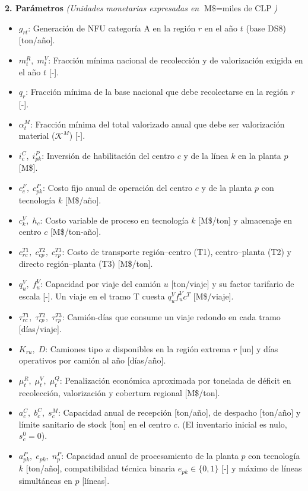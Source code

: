 \documentclass[letterpaper]{article}
\begin{document}
\textbf{2. Parámetros} \textit{(Unidades monetarias expresadas en $\text{M\$} = \text{miles de CLP}$)}
\begin{itemize}\setlength{\itemsep}{1pt}\setlength{\parskip}{0pt}
    \item $g_{rt}$: Generación de NFU categoría A en la región $r$ en el año $t$ (base DS8) [ton/año].
    \item $m^{R}_{t},\; m^{V}_{t}$: Fracción mínima nacional de recolección y de valorización exigida en el año $t$ [-].
    \item $q_{r}$: Fracción mínima de la base nacional que debe recolectarse en la región $r$ [-].
    \item $\alpha^{M}_{t}$: Fracción mínima del total valorizado anual que debe ser valorización material ($\mathcal{K}^{M}$) [-].
    \item $i^{C}_{c},\; i^{P}_{pk}$: Inversión de habilitación del centro $c$ y de la línea $k$ en la planta $p$ [M\$].
    \item $c^{F}_{c},\; c^{P}_{pk}$: Costo fijo anual de operación del centro $c$ y de la planta $p$ con tecnología $k$ [M\$/año].
    \item $c^{V}_{k},\; h_{c}$: Costo variable de proceso en tecnología $k$ [M\$/ton] y almacenaje en centro $c$ [M\$/ton-año].
    \item $c^{T1}_{rc},\; c^{T2}_{cp},\; c^{T3}_{rp}$: Costo de transporte región--centro (T1), centro--planta (T2) y directo región--planta (T3) [M\$/ton].
    \item $q^{V}_{u},\; f^{V}_{u}$: Capacidad por viaje del camión $u$ [ton/viaje] y su factor tarifario de escala [-]. Un viaje en el tramo T cuesta $q^{V}_{u} f^{V}_{u} c^{T}$ [M\$/viaje].
    \item $\tau^{T1}_{rc},\; \tau^{T2}_{cp},\; \tau^{T3}_{rp}$: Camión-días que consume un viaje redondo en cada tramo [días/viaje].
    \item $K_{ru},\; D$: Camiones tipo $u$ disponibles en la región extrema $r$ [un] y días operativos por camión al año [días/año].
    \item $\mu^{R}_{t},\; \mu^{V}_{t},\; \mu^{Q}_{t}$: Penalización económica aproximada por tonelada de déficit en recolección, valorización y cobertura regional [M\$/ton].
    \item $a^{C}_{c},\; b^{C}_{c},\; s^{M}_{c}$: Capacidad anual de recepción [ton/año], de despacho [ton/año] y límite sanitario de stock [ton] en el centro $c$. (El inventario inicial es nulo, $s^{0}_{c}=0$).
    \item $a^{P}_{pk},\; e_{pk},\; n^{P}_{p}$: Capacidad anual de procesamiento de la planta $p$ con tecnología $k$ [ton/año], compatibilidad técnica binaria $e_{pk} \in \{0,1\}$ [-] y máximo de líneas simultáneas en $p$ [líneas].
\end{itemize}
\end{document}
